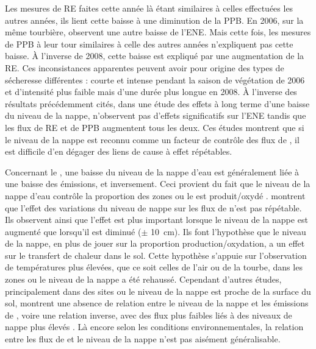 Les mesures de RE faites cette année là étant similaires à celles effectuées les autres années, ils lient cette baisse à une diminution de la PPB.
En 2006, sur la même tourbière, \citet{lund2012} observent une autre baisse de l'ENE.
Mais cette fois, les mesures de PPB à leur tour similaires à celle des autres années n'expliquent pas cette baisse.
À l'inverse de 2008, cette baisse est expliqué par une augmentation de la RE.
Ces inconsistances apparentes peuvent avoir pour origine des types de sécheresse différentes : courte et intense pendant la saison de végétation de 2006 et d'intensité plus faible mais d'une durée plus longue en 2008.
À l'inverse des résultats précédemment cités, \citet{ballantyne2014} dans une étude des effets à long terme d'une baisse du niveau de la nappe, n'observent pas d'effets significatifs sur l'ENE tandis que les flux de RE et de PPB augmentent tous les deux.
Ces études montrent que si le niveau de la nappe est reconnu comme un facteur de contrôle des flux de \coo, il est difficile d'en dégager des liens de cause à effet répétables.

Concernant le \chh, une baisse du niveau de la nappe d'eau est généralement liée à une baisse des émissions, et inversement.
Ceci provient du fait que le niveau de la nappe d'eau contrôle la proportion des zones ou le \chh est produit/oxydé \citep{pelletier2007}.
\citet{turetsky2008} montrent que l'effet des variations du niveau de nappe sur les flux de \chh n'est pas répétable.
Ils observent ainsi que l'effet est plus important lorsque le niveau de la nappe est augmenté que lorsqu'il est diminué ($\pm$ \SI{10}{\centi\metre}).
Ils font l'hypothèse que le niveau de la nappe, en plus de jouer sur la proportion production/oxydation, a un effet sur le transfert de chaleur dans le sol.
Cette hypothèse s'appuie sur l'observation de températures plus élevées, que ce soit celles de l'air ou de la tourbe, dans les zones ou le niveau de la nappe a été rehaussé.
Cependant d'autres études, principalement dans des sites ou le niveau de la nappe est proche de la surface du sol, montrent une absence de relation entre le niveau de la nappe et les émissions de \chh, voire une relation inverse, avec des flux plus faibles liés à des niveaux de nappe plus élevés \citep{kettunen1996,bellisario1999,treat2007}.
Là encore selon les conditions environnementales, la relation entre les flux de \chh et le niveau de la nappe n'est pas aisément généralisable.

